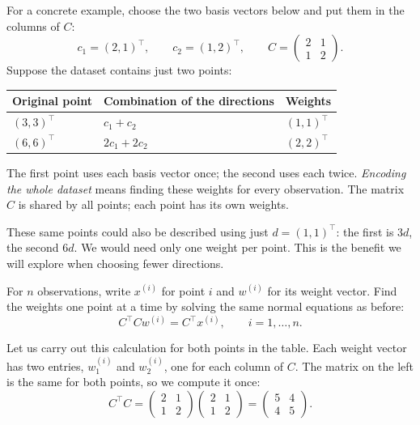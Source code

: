 \documentclass[a4paper,12pt,oneside]{report}
\begin{document}
For a concrete example, choose the two basis vectors below and put
them in the columns of $C$:
\[
  c_1=(2,1)^\top,\qquad c_2=(1,2)^\top,\qquad
  C=\begin{pmatrix}2&1\\1&2\end{pmatrix}.
\]
Suppose the dataset contains just two points:
\begin{center}
\begin{tabular}{@{}lll@{}}
\toprule
\textbf{Original point} & \textbf{Combination of the directions} & \textbf{Weights} \\
\midrule
$(3,3)^\top$ & $c_1+c_2$ & $(1,1)^\top$ \\
$(6,6)^\top$ & $2c_1+2c_2$ & $(2,2)^\top$ \\
\bottomrule
\end{tabular}
\end{center}
The first point uses each basis vector once; the second uses each
twice. \emph{Encoding the whole dataset} means finding these weights
for every observation. The matrix $C$ is shared by all points; each
point has its own weights.

These same points could also be described using just $d=(1,1)^\top$:
the first is $3d$, the second $6d$. We would need only one weight
per point. This is the benefit we will explore when choosing fewer
directions.

For $n$ observations, write $x^{(i)}$ for point $i$ and $w^{(i)}$
for its weight vector. Find the weights one point at a time by solving
the same normal equations as before:
\[
  C^\top Cw^{(i)}=C^\top x^{(i)},\qquad i=1,\ldots,n.
\]

\clearpage
Let us carry out this calculation for both points in the table.
Each weight vector has two entries, $w_1^{(i)}$ and $w_2^{(i)}$,
one for each column of $C$. The matrix on the left is the same for
both points, so we compute it once:
\[
  C^\top C
  =\begin{pmatrix}2&1\\1&2\end{pmatrix}
   \begin{pmatrix}2&1\\1&2\end{pmatrix}
  =\begin{pmatrix}5&4\\4&5\end{pmatrix}.
\]
\end{document}
